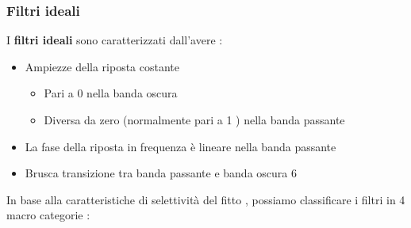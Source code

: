 \documentclass{article}
\theoremstyle{definition}
\begin{document}
\subsubsection{Filtri ideali}
I \textbf{filtri ideali} sono caratterizzati dall'avere :
\begin{itemize}
	\item Ampiezze della riposta costante 
	\begin{itemize}
	\item Pari a 0 nella banda oscura 
	\item Diversa da zero (normalmente pari a 1 ) nella banda passante 
	\end{itemize}
	\item La fase della riposta in frequenza è lineare nella banda passante 
	\item Brusca transizione tra banda passante e banda oscura 6
\end{itemize}
In base alla caratteristiche di selettività del fitto , possiamo classificare i filtri in 4 macro categorie : 
\end{document}

